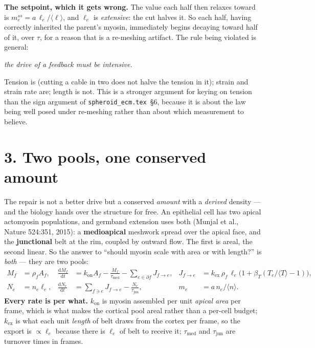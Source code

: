 \documentclass[10pt,a4paper]{article}
\newcommand{\code}[1]{\texttt{#1}}
\begin{document}
\textbf{The setpoint, which it gets wrong.} The value each half then relaxes toward is
$m^{ss}_e = a\,\ell_e/\langle\ell\rangle$, and $\ell_e$ is \emph{extensive}: the cut halves it. So each
half, having correctly inherited the parent's myosin, immediately begins decaying toward half of it,
over $\tau$, for a reason that is a re-meshing artifact. The rule being violated is general:

\begin{center}\itshape the drive of a feedback must be intensive.\end{center}

Tension is (cutting a cable in two does not halve the tension in it); strain and strain rate are;
length is not. This is a stronger argument for keying on tension than the sign argument of
\code{spheroid\_ecm.tex}~\S6, because it is about the law being well posed under re-meshing rather
than about which measurement to believe.

\section*{3.\; Two pools, one conserved amount}

The repair is not a better drive but a conserved \emph{amount} with a \emph{derived} density --- and
the biology hands over the structure for free. An epithelial cell has two apical actomyosin
populations, and germband extension uses both (Munjal et al., Nature 524:351, 2015): a
\textbf{medioapical} meshwork spread over the apical face, and the \textbf{junctional} belt at the
rim, coupled by outward flow. The first is areal, the second linear. So the answer to ``should myosin
scale with area or with length?'' is \emph{both} --- they are two pools:
%
\begin{align}
M_f&=\rho_f A_f, &\frac{\mathrm{d}M_f}{\mathrm{d}t}
 &= k_{\text{on}}A_f-\frac{M_f}{\tau_{\text{med}}}-\!\!\sum_{e\in\partial f}\!\!J_{f\to e},
 &J_{f\to e}&=k_{\text{ex}}\,\rho_f\,\ell_e\bigl(1+\beta_T(T_e/\langle T\rangle-1)\bigr),
\label{eq:med}\\[2pt]
N_e&=n_e\ell_e, &\frac{\mathrm{d}N_e}{\mathrm{d}t}
 &= \sum_{f\ni e}J_{f\to e}-\frac{N_e}{\tau_{\text{jun}}},
 &m_e&=a\,n_e/\langle n\rangle .
\label{eq:jun}
\end{align}
%
\textbf{Every rate is per what.} $k_{\text{on}}$ is myosin assembled per unit \emph{apical area} per
frame, which is what makes the cortical pool areal rather than a per-cell budget; $k_{\text{ex}}$ is
what each unit \emph{length} of belt draws from the cortex per frame, so the export is $\propto\ell_e$
because there is $\ell_e$ of belt to receive it; $\tau_{\text{med}}$ and $\tau_{\text{jun}}$ are
turnover times in frames.
\end{document}

